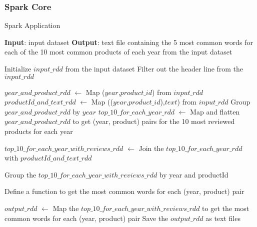  
  \subsubsection{Spark Core}
  \begin{algorithm}
    \caption{Spark Application}
    \begin{algorithmic}[1]
    
    \STATE \textbf{Input}: input dataset
    \STATE \textbf{Output}: text file containing the 5 most common words for each of the 10 most common products of each year from the input dataset
    
    \STATE Initialize $input\_rdd$ from the input dataset
    \STATE Filter out the header line from the $input\_rdd$
    
    \STATE $year\_and\_product\_rdd$ $\gets$ Map ($year$,$product\_id$) from $input\_rdd$
    \STATE $productId\_and\_text\_rdd$ $\gets$ Map (($year$,$product\_id$),$text$) from $input\_rdd$
    \STATE Group $year\_and\_product\_rdd$ by $year$
    \STATE $top\_10\_for\_each\_year\_rdd$ $\gets$ Map and flatten $year\_and\_product\_rdd$ to get (year, product) pairs for the 10 most reviewed products for each year
    
    \STATE $top\_10\_for\_each\_year\_with\_reviews\_rdd$ $\gets$ Join the $top\_10\_for\_each\_year\_rdd$ with $productId\_and\_text\_rdd$
    
    \STATE Group the $top\_10\_for\_each\_year\_with\_reviews\_rdd$ by year and productId
    
    \STATE Define a function to get the most common words for each (year, product) pair
    
    \STATE $output\_rdd$ $\gets$ Map the $top\_10\_for\_each\_year\_with\_reviews\_rdd$ to get the most common words for each (year, product) pair
    \STATE Save the $output\_rdd$ as text files
    
    \end{algorithmic}
    \end{algorithm}

